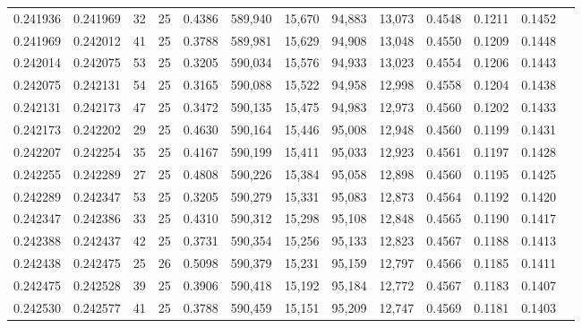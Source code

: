 \begin{tabular}{rrrrrrrrrrrrr}
0.241936 & 0.241969 &    32 &  25 &                                     0.4386 & 589,940 &  15,670 &  94,883 &  13,073 & 0.4548 & 0.1211 & 0.1452 \\
0.241969 & 0.242012 &    41 &  25 &                                     0.3788 & 589,981 &  15,629 &  94,908 &  13,048 & 0.4550 & 0.1209 & 0.1448 \\
0.242014 & 0.242075 &    53 &  25 &                                     0.3205 & 590,034 &  15,576 &  94,933 &  13,023 & 0.4554 & 0.1206 & 0.1443 \\
0.242075 & 0.242131 &    54 &  25 &                                     0.3165 & 590,088 &  15,522 &  94,958 &  12,998 & 0.4558 & 0.1204 & 0.1438 \\
0.242131 & 0.242173 &    47 &  25 &                                     0.3472 & 590,135 &  15,475 &  94,983 &  12,973 & 0.4560 & 0.1202 & 0.1433 \\
0.242173 & 0.242202 &    29 &  25 &                                     0.4630 & 590,164 &  15,446 &  95,008 &  12,948 & 0.4560 & 0.1199 & 0.1431 \\
0.242207 & 0.242254 &    35 &  25 &                                     0.4167 & 590,199 &  15,411 &  95,033 &  12,923 & 0.4561 & 0.1197 & 0.1428 \\
0.242255 & 0.242289 &    27 &  25 &                                     0.4808 & 590,226 &  15,384 &  95,058 &  12,898 & 0.4560 & 0.1195 & 0.1425 \\
0.242289 & 0.242347 &    53 &  25 &                                     0.3205 & 590,279 &  15,331 &  95,083 &  12,873 & 0.4564 & 0.1192 & 0.1420 \\
0.242347 & 0.242386 &    33 &  25 &                                     0.4310 & 590,312 &  15,298 &  95,108 &  12,848 & 0.4565 & 0.1190 & 0.1417 \\
0.242388 & 0.242437 &    42 &  25 &                                     0.3731 & 590,354 &  15,256 &  95,133 &  12,823 & 0.4567 & 0.1188 & 0.1413 \\
0.242438 & 0.242475 &    25 &  26 &                                     0.5098 & 590,379 &  15,231 &  95,159 &  12,797 & 0.4566 & 0.1185 & 0.1411 \\
0.242475 & 0.242528 &    39 &  25 &                                     0.3906 & 590,418 &  15,192 &  95,184 &  12,772 & 0.4567 & 0.1183 & 0.1407 \\
0.242530 & 0.242577 &    41 &  25 &                                     0.3788 & 590,459 &  15,151 &  95,209 &  12,747 & 0.4569 & 0.1181 & 0.1403 \\

\end{tabular}
